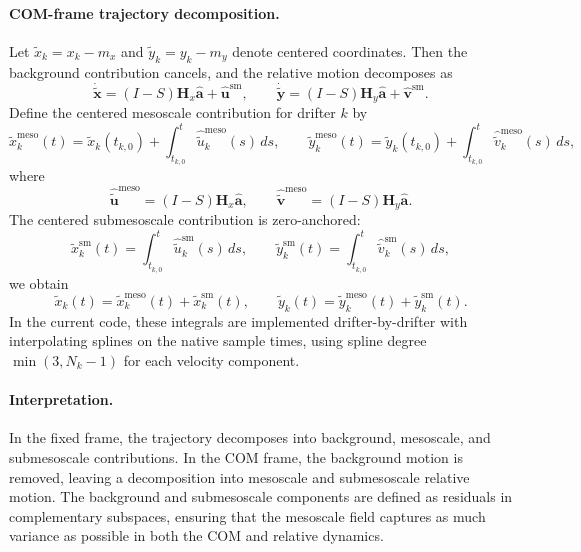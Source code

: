 \documentclass{article}
\begin{document}
\paragraph{COM-frame trajectory decomposition.}
Let $\tilde{x}_k = x_k - m_x$ and $\tilde{y}_k = y_k - m_y$ denote
centered coordinates. Then the background contribution cancels, and the
relative motion decomposes as
\begin{equation}
\dot{\tilde{\mathbf{x}}}
=
(I-S)\mathbf{H}_x \hat{\mathbf a}
+
\hat{\mathbf{u}}^{\mathrm{sm}},
\qquad
\dot{\tilde{\mathbf{y}}}
=
(I-S)\mathbf{H}_y \hat{\mathbf a}
+
\hat{\mathbf{v}}^{\mathrm{sm}}.
\end{equation}
Define the centered mesoscale contribution for drifter $k$ by
\begin{equation}
\tilde{x}_k^{\mathrm{meso}}(t)
=
\tilde{x}_k(t_{k,0})+\int_{t_{k,0}}^{t} \hat{\tilde{u}}_k^{\mathrm{meso}}(s)\,ds,
\qquad
\tilde{y}_k^{\mathrm{meso}}(t)
=
\tilde{y}_k(t_{k,0})+\int_{t_{k,0}}^{t} \hat{\tilde{v}}_k^{\mathrm{meso}}(s)\,ds,
\end{equation}
where
\begin{equation}
\hat{\tilde{\mathbf{u}}}^{\mathrm{meso}}=(I-S)\mathbf{H}_x\hat{\mathbf a},
\qquad
\hat{\tilde{\mathbf{v}}}^{\mathrm{meso}}=(I-S)\mathbf{H}_y\hat{\mathbf a}.
\end{equation}
The centered submesoscale contribution is zero-anchored:
\begin{equation}
\tilde{x}_k^{\mathrm{sm}}(t)
=
\int_{t_{k,0}}^{t} \hat{\tilde{u}}_k^{\mathrm{sm}}(s)\,ds,
\qquad
\tilde{y}_k^{\mathrm{sm}}(t)
=
\int_{t_{k,0}}^{t} \hat{\tilde{v}}_k^{\mathrm{sm}}(s)\,ds,
\end{equation}
we obtain
\begin{equation}
\tilde{x}_k(t)
=
\tilde{x}_k^{\mathrm{meso}}(t)
+
\tilde{x}_k^{\mathrm{sm}}(t),
\qquad
\tilde{y}_k(t)
=
\tilde{y}_k^{\mathrm{meso}}(t)
+
\tilde{y}_k^{\mathrm{sm}}(t).
\end{equation}
In the current code, these integrals are implemented drifter-by-drifter with
interpolating splines on the native sample times, using spline degree
$\min(3,N_k-1)$ for each velocity component.

\paragraph{Interpretation.}
In the fixed frame, the trajectory decomposes into background,
mesoscale, and submesoscale contributions. In the COM frame, the
background motion is removed, leaving a decomposition into mesoscale and
submesoscale relative motion. The background and submesoscale components
are defined as residuals in complementary subspaces, ensuring that the
mesoscale field captures as much variance as possible in both the COM
and relative dynamics.
\end{document}
